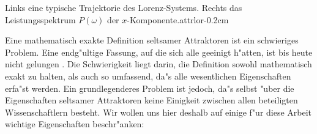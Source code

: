 {Links eine typische Trajektorie des Lorenz-Systems.  Rechts das Leistungsspektrum $P(\omega)$ der 
$x$-Komponente.}{attrlor}{-0.2cm}

Eine mathematisch exakte Definition seltsamer Attraktoren ist ein schwieriges
Problem. Eine endg"ultige Fassung, auf die sich alle geeinigt h"atten, ist bis heute nicht
gelungen \cite{Pawelzik91}. Die Schwierigkeit liegt darin, die Definition sowohl
mathematisch exakt zu halten, als auch so umfassend, da"s alle wesentlichen Eigenschaften
erfa"st werden. Ein grundlegenderes Problem ist jedoch, da"s selbst "uber die
Eigenschaften seltsamer Attraktoren keine Einigkeit zwischen allen beteiligten Wissenschaftlern
besteht. Wir wollen uns hier deshalb auf einige f"ur diese 
Arbeit wichtige Eigenschaften beschr"anken:
